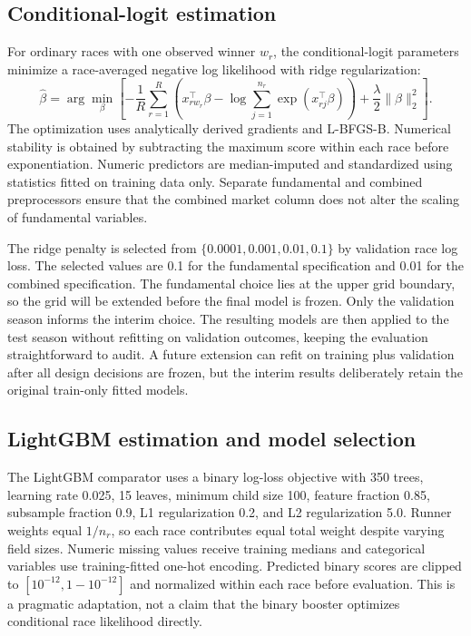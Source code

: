 \subsection{Conditional-logit estimation}\label{sec:methods-logit}
For ordinary races with one observed winner $w_r$, the conditional-logit parameters minimize a race-averaged negative log likelihood with ridge regularization:
\begin{equation}
\widehat{\beta}
=\arg\min_{\beta}\left[
-\frac{1}{R}\sum_{r=1}^{R}
\left(x_{rw_r}^{\top}\beta-\log\sum_{j=1}^{n_r}\exp(x_{rj}^{\top}\beta)\right)
+\frac{\lambda}{2}\lVert\beta\rVert_2^2
\right].
\label{eq:clogit-objective}
\end{equation}
The optimization uses analytically derived gradients and L-BFGS-B. Numerical stability is obtained by subtracting the maximum score within each race before exponentiation. Numeric predictors are median-imputed and standardized using statistics fitted on training data only. Separate fundamental and combined preprocessors ensure that the combined market column does not alter the scaling of fundamental variables.

The ridge penalty is selected from $\{0.0001,0.001,0.01,0.1\}$ by validation race log loss. The selected values are 0.1 for the fundamental specification and 0.01 for the combined specification. The fundamental choice lies at the upper grid boundary, so the grid will be extended before the final model is frozen. Only the validation season informs the interim choice. The resulting models are then applied to the test season without refitting on validation outcomes, keeping the evaluation straightforward to audit. A future extension can refit on training plus validation after all design decisions are frozen, but the interim results deliberately retain the original train-only fitted models.

\subsection{LightGBM estimation and model selection}\label{sec:methods-lgbm}
The LightGBM comparator uses a binary log-loss objective with 350 trees, learning rate 0.025, 15 leaves, minimum child size 100, feature fraction 0.85, subsample fraction 0.9, L1 regularization 0.2, and L2 regularization 5.0. Runner weights equal $1/n_r$, so each race contributes equal total weight despite varying field sizes. Numeric missing values receive training medians and categorical variables use training-fitted one-hot encoding. Predicted binary scores are clipped to $[10^{-12},1-10^{-12}]$ and normalized within each race before evaluation. This is a pragmatic adaptation, not a claim that the binary booster optimizes conditional race likelihood directly.

